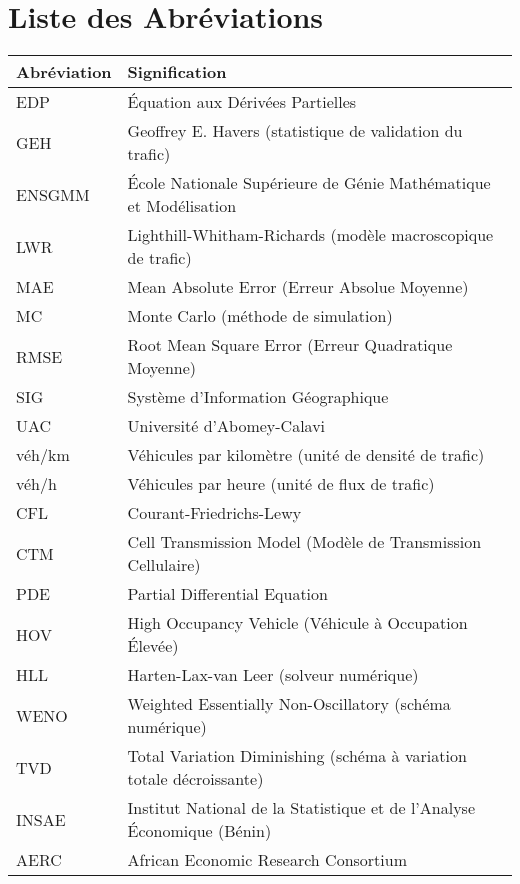 \chapter*{Liste des Abréviations}
\thispagestyle{fancy}

\begin{tabular}{ll}
\toprule
\textbf{Abréviation} & \textbf{Signification} \\
\midrule
EDP & Équation aux Dérivées Partielles \\
GEH & Geoffrey E. Havers (statistique de validation du trafic) \\
ENSGMM & École Nationale Supérieure de Génie Mathématique et Modélisation \\
LWR & Lighthill-Whitham-Richards (modèle macroscopique de trafic) \\
MAE & Mean Absolute Error (Erreur Absolue Moyenne) \\
MC & Monte Carlo (méthode de simulation) \\
RMSE & Root Mean Square Error (Erreur Quadratique Moyenne) \\
SIG & Système d'Information Géographique \\
UAC & Université d'Abomey-Calavi \\
véh/km & Véhicules par kilomètre (unité de densité de trafic) \\
véh/h & Véhicules par heure (unité de flux de trafic) \\
CFL & Courant-Friedrichs-Lewy \\
CTM & Cell Transmission Model (Modèle de Transmission Cellulaire) \\
PDE & Partial Differential Equation \\
HOV & High Occupancy Vehicle (Véhicule à Occupation Élevée) \\
HLL & Harten-Lax-van Leer (solveur numérique) \\
WENO & Weighted Essentially Non-Oscillatory (schéma numérique) \\
TVD & Total Variation Diminishing (schéma à variation totale décroissante) \\
INSAE & Institut National de la Statistique et de l'Analyse Économique (Bénin) \\
AERC & African Economic Research Consortium \\
\bottomrule
\end{tabular}

\vspace{1cm}

